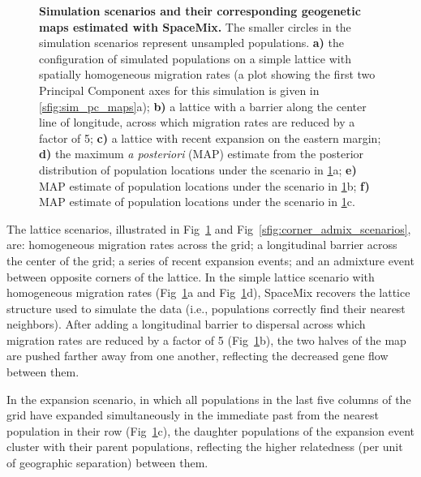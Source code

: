 \documentclass[10pt,letterpaper]{article}
\begin{document}
\begin{figure}[ht!]
\begin{center}
\end{center}
\caption{
\textbf{Simulation scenarios and their corresponding geogenetic maps estimated with SpaceMix.}
    The smaller circles in the simulation scenarios represent unsampled populations.  
    \textbf{a)} 
    the configuration of simulated populations on a simple lattice with spatially homogeneous migration rates 
    (a plot showing the first two Principal Component axes for this simulation is given in \ref{sfig:sim_pc_maps}a); 
    \textbf{b)} 
    a lattice with a barrier along the center line of longitude, across which migration rates are reduced by a factor of 5; 
    \textbf{c)} a lattice with recent expansion on the eastern margin; 
    \textbf{d)} the maximum \textit{a posteriori} (MAP) estimate from the posterior distribution of population locations 
    under the scenario in \ref{sfig:lattice_scenarios}a; 
    \textbf{e)} MAP estimate of population locations under the scenario in \ref{sfig:lattice_scenarios}b;
    \textbf{f)} MAP estimate of population locations under the scenario in \ref{sfig:lattice_scenarios}c.
    }\label{sfig:lattice_scenarios}
\end{figure}


The lattice scenarios, illustrated in Fig\ \ref{sfig:lattice_scenarios} and Fig\ \ref{sfig:corner_admix_scenarios}, are: 
homogeneous migration rates across the grid; a longitudinal barrier across the center of the grid; a series of recent expansion events; and an admixture event between opposite corners of the lattice.  In the simple lattice scenario with homogeneous migration rates (Fig\ \ref{sfig:lattice_scenarios}a and Fig\ \ref{sfig:lattice_scenarios}d), SpaceMix recovers the lattice structure used to simulate the data (i.e., populations correctly find their nearest neighbors).  
After adding a longitudinal barrier to dispersal across which migration rates are reduced by a factor of 5 (Fig\ \ref{sfig:lattice_scenarios}b), 
the two halves of the map are pushed farther away from one another, 
reflecting the decreased gene flow between them.

In the expansion scenario, in which all populations in the last five columns of the grid have expanded simultaneously in the immediate past from the nearest population in their row (Fig\ \ref{sfig:lattice_scenarios}c), 
the daughter populations of the expansion event cluster with their parent populations, reflecting the higher relatedness (per unit of geographic separation) between them.
\end{document}
